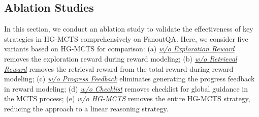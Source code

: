 \begin{table}[t]
    \centering
    \small
{}
    \caption{The evaluation results on FanoutQA. The symbol ``$^{\dagger}$'' denotes that the performance improvement is statistically significant with p < 0.05 compared against all the baselines. LLaMA3 is the abbreviation of LLaMA3-70B-Instruct.}
    \label{tab:fanoutqa}
\end{table}


\subsection{Ablation Studies}
\label{sec:ablation}

In this section, we conduct an ablation study to validate the effectiveness of key strategies in HG-MCTS comprehensively on FanoutQA. Here, we consider five variants based on HG-MCTS for comparison: (a) \underline{\textit{w/o Exploration Reward}} removes the exploration reward during reward modeling; (b) \underline{\textit{w/o Retrieval Reward}} removes the retrieval reward from the total reward during reward modeling; (c) \underline{\textit{w/o Progress Feedback}} eliminates generating the progress feedback in reward modeling; (d) \underline{\textit{w/o Checklist}} removes checklist for global guidance in the MCTS process; (e) \underline{\textit{w/o HG-MCTS}} removes the entire HG-MCTS strategy, reducing the approach to a linear reasoning strategy.

